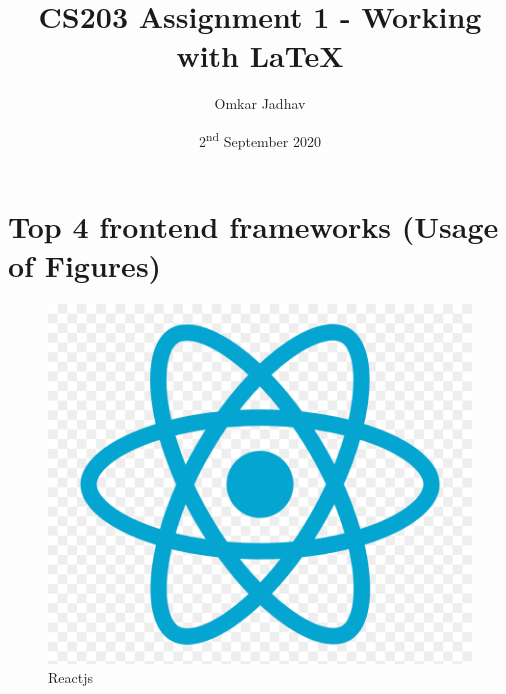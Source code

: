 \documentclass{article}
\begin{document}
\tableofcontents
\listoffigures
\listoftables
\newpage
\title{CS203 Assignment 1 - Working with \LaTeX}
\author{Omkar Jadhav}
\date{2\textsuperscript{nd} September 2020}
\maketitle
\section{Top 4 frontend frameworks (Usage of Figures)} %
\begin{figure}[H]
  \centering
  \begin{minipage}[l]{0.4\textwidth}
    \includegraphics[width=\textwidth,scale=0.5]{reactjs.png}
    \caption{Reactjs}
    \label{fig:Reactjs}
  \end{minipage}
  \hfill
  \begin{minipage}[c]{0.4\textwidth}

\end{minipage}
\end{figure}
\end{document}
